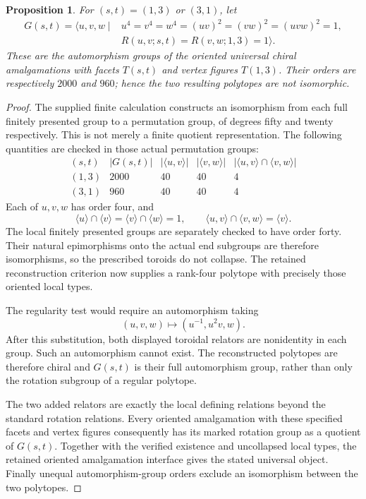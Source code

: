 \documentclass[11pt,a4paper]{article}
\newtheorem{proposition}{Proposition}
\begin{document}
\begin{proposition}
For $(s,t)=(1,3)$ or $(3,1)$, let
\begin{align*}
 G(s,t)=\langle u,v,w\mid{}&u^4=v^4=w^4=(uv)^2=(vw)^2=(uvw)^2=1,\\
                         &R(u,v;s,t)=R(v,w;1,3)=1\rangle .
\end{align*}
These are the automorphism groups of the oriented universal chiral
amalgamations with facets $T(s,t)$ and vertex figures $T(1,3)$.
Their orders are respectively $2000$ and $960$; hence the two resulting
polytopes are not isomorphic.
\end{proposition}
\begin{proof}
The supplied finite calculation constructs an isomorphism from each full
finitely presented group to a permutation group, of degrees fifty and
twenty respectively. This is not merely a finite quotient representation.
The following quantities are checked in those actual permutation groups:
\[
\begin{array}{c|r|r|r|r}
(s,t)&|G(s,t)|&|\langle u,v\rangle|&|\langle v,w\rangle|
 &|\langle u,v\rangle\cap\langle v,w\rangle|\\\hline
(1,3)&2000&40&40&4\\
(3,1)&960&40&40&4
\end{array}
\]
Each of $u,v,w$ has order four, and
\[
 \langle u\rangle\cap\langle v\rangle
 =\langle v\rangle\cap\langle w\rangle=1,\qquad
 \langle u,v\rangle\cap\langle v,w\rangle=\langle v\rangle.
\]
The local finitely presented groups are separately checked to have order
forty. Their natural epimorphisms onto the actual end subgroups are
therefore isomorphisms, so the prescribed toroids do not collapse.
The retained reconstruction criterion now supplies a rank-four polytope
with precisely those oriented local types.

The regularity test would require an automorphism taking
\[
              (u,v,w)\longmapsto(u^{-1},u^2v,w).
\]
After this substitution, both displayed toroidal relators are nonidentity
in each group. Such an automorphism cannot exist. The reconstructed
polytopes are therefore chiral and $G(s,t)$ is their full automorphism
group, rather than only the rotation subgroup of a regular polytope.

The two added relators are exactly the local defining relations beyond
the standard rotation relations. Every oriented amalgamation with these
specified facets and vertex figures consequently has its marked rotation
group as a quotient of $G(s,t)$. Together with the verified existence
and uncollapsed local types, the retained oriented amalgamation interface
gives the stated universal object. Finally unequal automorphism-group
orders exclude an isomorphism between the two polytopes.
\end{proof}
\end{document}
